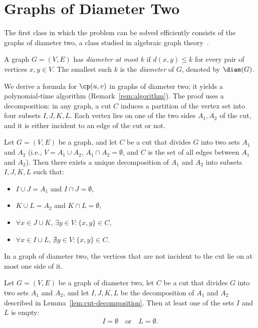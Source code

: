 \section{Graphs of Diameter Two}
\label{sec:diameter-two}

The first class in which the problem can be solved efficiently consists of the graphs of diameter two, a class studied in algebraic graph theory~\cite{GodsilRoyle2001}.

\begin{definition}[Diameter]
\label{def:diameter}
A graph $G = (V, E)$ has \emph{diameter at most $k$} if $d(x, y) \leq k$ for every pair of vertices $x, y \in V$.
The smallest such $k$ is the \emph{diameter} of $G$, denoted by $\diam(G)$.
\end{definition}

We derive a formula for $\cp(u,v)$ in graphs of diameter two; it yields a polynomial-time algorithm (Remark~\ref{rem:algorithm}).
The proof uses a decomposition: in any graph, a cut $C$ induces a partition of the vertex set into four subsets $I, J, K, L$.
Each vertex lies on one of the two sides $A_1, A_2$ of the cut, and it is either incident to an edge of the cut or not.

\begin{lemma}
\label{lem:cut-decomposition}
Let $G = (V, E)$ be a graph, and let $C$ be a cut that divides $G$ into two sets $A_1$ and $A_2$ (i.e., $V = A_1 \cup A_2$, $A_1 \cap A_2 = \emptyset$, and $C$ is the set of all edges between $A_1$ and $A_2$).
Then there exists a unique decomposition of $A_1$ and $A_2$ into subsets $I, J, K, L$ such that:
\begin{itemize}
    \item $I \cup J = A_1$ and $I \cap J = \emptyset$,
    \item $K \cup L = A_2$ and $K \cap L = \emptyset$,
    \item $\forall x \in J \cup K, \, \exists y \in V: \{x, y\} \in C,$
    \item $\forall x \in I \cup L, \, \nexists y \in V: \{x, y\} \in C.$
\end{itemize}
\end{lemma}

In a graph of diameter two, the vertices that are not incident to the cut lie on at most one side of it.

\begin{lemma}
\label{lem:empty-i-or-l}
Let $G = (V, E)$ be a graph of diameter two, let $C$ be a cut that divides $G$ into two sets $A_1$ and $A_2$, and let $I, J, K, L$ be the decomposition of $A_1$ and $A_2$ described in Lemma~\ref{lem:cut-decomposition}.
Then at least one of the sets $I$ and $L$ is empty:
\[
I = \emptyset \quad\text{or}\quad L = \emptyset.
\]
\end{lemma}

